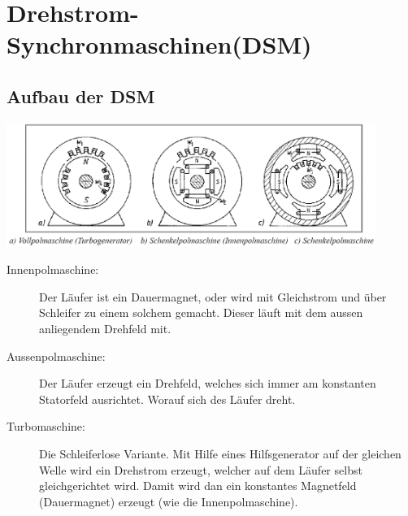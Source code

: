 \section{Drehstrom- Synchronmaschinen(DSM)}
    \subsection{Aufbau der DSM}
        \includegraphics[width=12cm]{./images/Aufbau_DSM.png}\\
        \begin{description}
            \item[Innenpolmaschine:] Der Läufer ist ein Dauermagnet, oder wird mit Gleichstrom und über Schleifer
            zu einem solchem gemacht. Dieser läuft mit dem aussen anliegendem Drehfeld mit.
            \item[Aussenpolmaschine:] Der Läufer erzeugt ein Drehfeld, welches sich immer am konstanten Statorfeld
            ausrichtet. Worauf sich des Läufer dreht.
            \item[Turbomaschine:] Die Schleiferlose Variante. Mit Hilfe eines Hilfsgenerator auf der gleichen Welle
            wird ein Drehstrom erzeugt, welcher auf dem Läufer selbst gleichgerichtet wird. Damit wird dan ein
            konstantes Magnetfeld (Dauermagnet) erzeugt (wie die Innenpolmaschine).
        \end{description}

